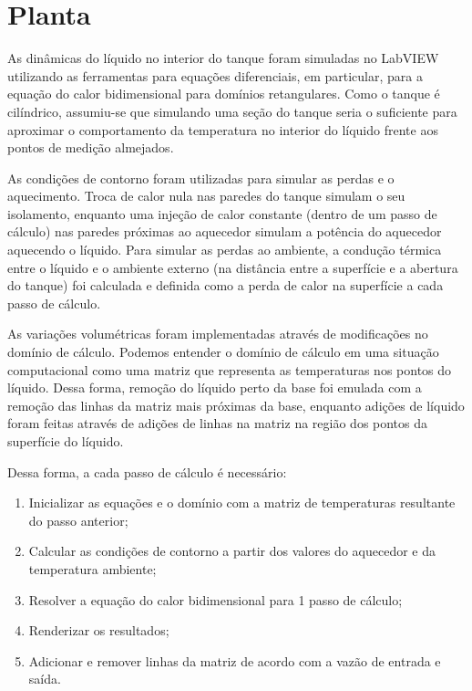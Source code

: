 \section{Planta}

As dinâmicas do líquido no interior do tanque foram simuladas no LabVIEW utilizando as ferramentas para equações diferenciais, em particular, para a equação do calor bidimensional para domínios retangulares. Como o tanque é cilíndrico, assumiu-se que simulando uma seção do tanque seria o suficiente para aproximar o comportamento da temperatura no interior do líquido frente aos pontos de medição almejados.

As condições de contorno foram utilizadas para simular as perdas e o aquecimento. Troca de calor nula nas paredes do tanque simulam o seu isolamento, enquanto uma injeção de calor constante (dentro de um passo de cálculo) nas paredes próximas ao aquecedor simulam a potência do aquecedor aquecendo o líquido. Para simular as perdas ao ambiente, a condução térmica entre o líquido e o ambiente externo (na distância entre a superfície e a abertura do tanque) foi calculada e definida como a perda de calor na superfície a cada passo de cálculo.

As variações volumétricas foram implementadas através de modificações no domínio de cálculo. Podemos entender o domínio de cálculo em uma situação computacional como uma matriz que representa as temperaturas nos pontos do líquido. Dessa forma, remoção do líquido perto da base foi emulada com a remoção das linhas da matriz mais próximas da base, enquanto adições de líquido foram feitas através de adições de linhas na matriz na região dos pontos da superfície do líquido.

Dessa forma, a cada passo de cálculo é necessário:
\begin{enumerate}
    \item Inicializar as equações e o domínio com a matriz de temperaturas resultante do passo anterior;
    \item Calcular as condições de contorno a partir dos valores do aquecedor e da temperatura ambiente;
    \item Resolver a equação do calor bidimensional para 1 passo de cálculo;
    \item Renderizar os resultados;
    \item Adicionar e remover linhas da matriz de acordo com a vazão de entrada e saída.
\end{enumerate}

